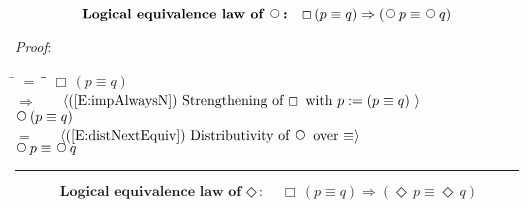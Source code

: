 \documentclass[12pt, fleqn, leqno]{article}
\newcommand{\lgap}{2pt}                             %
\newcommand{\mymathindent}{24pt}                    %
\newcommand{\impl}{\ensuremath{\Rightarrow}}        %
\newcommand{\Next}{\;\,\text{\raisebox{3.5pt}{\circle{6}}}}
\newcommand{\Event}{\Diamond\,}
\newcommand{\Always}{\Box\,}
\newcommand{\myqed}{\rule[-.23ex]{1.2ex}{2.0ex}}
\newcommand{\myqedtab}{\hspace{384pt}}              %
\newcommand{\Gll} {\langle}                         %
\newcommand{\Ggg} {\rangle}                         %
\newcommand{\Hint}[1]     {\ \ \ $\Gll              \mbox{#1} \Ggg$ }   %
\begin{document}
\begin{equation}\label{E:distNextEquiv2}
\textbf{Logical equivalence law of $\Next$:}\quad \Always (p \equiv q) \impl (\Next p \equiv \Next q)
\end{equation}

\emph{Proof}:
\begin{tabbing}
\hspace{\mymathindent} \= $= \;$ \= \myqedtab \= \kill
  \> \>   $\Always (p \equiv q) $\\[\lgap]
  \> $\impl$  \>  \Hint{(\ref{E:impAlwaysN}) Strengthening of $\Always$ with $p:=(p \equiv q)$ }\\[\lgap]
  \> \>   $\Next (p \equiv q) $\\[\lgap]
  \> $=$  \>  \Hint{(\ref{E:distNextEquiv}) Distributivity of $\Next$ over $\equiv$}\\[\lgap]
  \> \>   $\Next p \equiv  \Next q$\quad \myqed
\end{tabbing}
\begin{equation}\label{E:LELevent}
\textbf{Logical equivalence law of $\Event$:}\quad \Always (p \equiv q) \impl (\Event p \equiv \Event q)
\end{equation}
\end{document}
